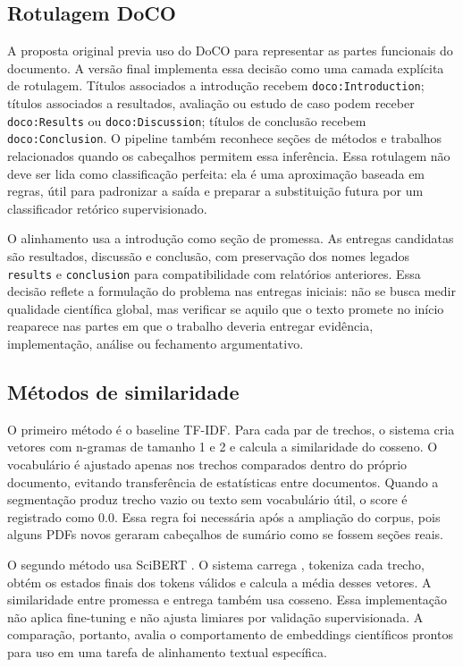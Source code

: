 \documentclass[12pt]{article}
\begin{document}
\subsection{Rotulagem DoCO}

A proposta original previa uso do DoCO para representar as partes funcionais do documento. A versão final implementa essa decisão como uma camada explícita de rotulagem. Títulos associados a introdução recebem \texttt{doco:Introduction}; títulos associados a resultados, avaliação ou estudo de caso podem receber \texttt{doco:Results} ou \texttt{doco:Discussion}; títulos de conclusão recebem \texttt{doco:Conclusion}. O pipeline também reconhece seções de métodos e trabalhos relacionados quando os cabeçalhos permitem essa inferência. Essa rotulagem não deve ser lida como classificação perfeita: ela é uma aproximação baseada em regras, útil para padronizar a saída e preparar a substituição futura por um classificador retórico supervisionado.

O alinhamento usa a introdução como seção de promessa. As entregas candidatas são resultados, discussão e conclusão, com preservação dos nomes legados \texttt{results} e \texttt{conclusion} para compatibilidade com relatórios anteriores. Essa decisão reflete a formulação do problema nas entregas iniciais: não se busca medir qualidade científica global, mas verificar se aquilo que o texto promete no início reaparece nas partes em que o trabalho deveria entregar evidência, implementação, análise ou fechamento argumentativo.

\subsection{Métodos de similaridade}

O primeiro método é o baseline TF-IDF. Para cada par de trechos, o sistema cria vetores com n-gramas de tamanho 1 e 2 e calcula a similaridade do cosseno. O vocabulário é ajustado apenas nos trechos comparados dentro do próprio documento, evitando transferência de estatísticas entre documentos. Quando a segmentação produz trecho vazio ou texto sem vocabulário útil, o score é registrado como 0.0. Essa regra foi necessária após a ampliação do corpus, pois alguns PDFs novos geraram cabeçalhos de sumário como se fossem seções reais.

O segundo método usa SciBERT \cite{beltagy2019scibert}. O sistema carrega , tokeniza cada trecho, obtém os estados finais dos tokens válidos e calcula a média desses vetores. A similaridade entre promessa e entrega também usa cosseno. Essa implementação não aplica fine-tuning e não ajusta limiares por validação supervisionada. A comparação, portanto, avalia o comportamento de embeddings científicos prontos para uso em uma tarefa de alinhamento textual específica.
\end{document}
